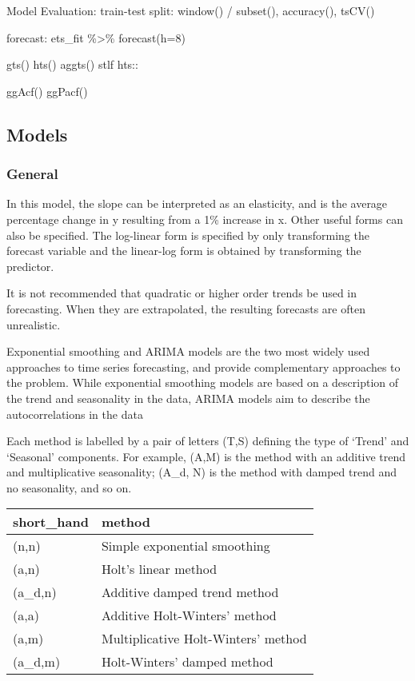 \documentclass[]{book}
\begin{document}
Model Evaluation: train-test split: window() / subset(), accuracy(), tsCV()

forecast: ets\_fit \%\textgreater{}\% forecast(h=8)

gts() \textbar{} hts() \textbar{} aggts() \textbar{} stlf \textbar{} hts::

ggAcf() \textbar{} ggPacf()

\hypertarget{models}{%
\subsection{Models}\label{models}}

\hypertarget{general-5}{%
\subsubsection{General}\label{general-5}}

In this model, the slope can be interpreted as an elasticity, and is the average percentage change in y resulting from a 1\% increase in x. Other useful forms can also be specified. The log-linear form is specified by only transforming the forecast variable and the linear-log form is obtained by transforming the predictor.

It is not recommended that quadratic or higher order trends be used in forecasting. When they are extrapolated, the resulting forecasts are often unrealistic.

Exponential smoothing and ARIMA models are the two most widely used approaches to time series forecasting, and provide complementary approaches to the problem. While exponential smoothing models are based on a description of the trend and seasonality in the data, ARIMA models aim to describe the autocorrelations in the data

Each method is labelled by a pair of letters (T,S) defining the type of `Trend' and `Seasonal' components. For example, (A,M) is the method with an additive trend and multiplicative seasonality; (A\_d, N) is the method with damped trend and no seasonality, and so on.

\begin{longtable}[]{@{}ll@{}}
\toprule
short\_hand & method\tabularnewline
\midrule
\endhead
(n,n) & Simple exponential smoothing\tabularnewline
(a,n) & Holt's linear method\tabularnewline
(a\_d,n) & Additive damped trend method\tabularnewline
(a,a) & Additive Holt-Winters' method\tabularnewline
(a,m) & Multiplicative Holt-Winters' method\tabularnewline
(a\_d,m) & Holt-Winters' damped method\tabularnewline
\bottomrule
\end{longtable}
\end{document}
